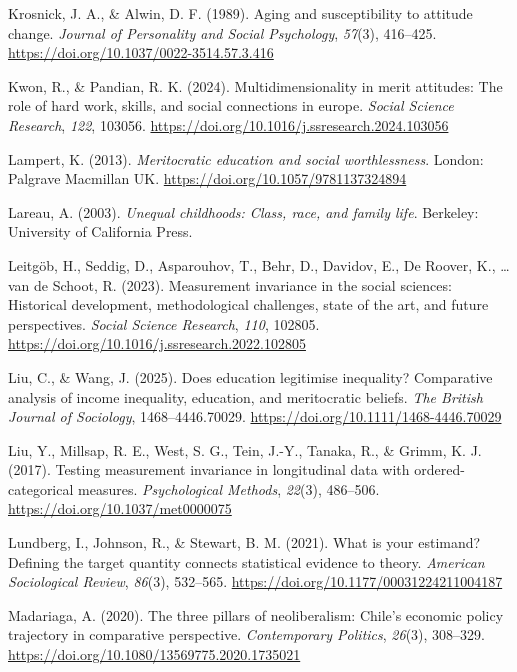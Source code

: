 \documentclass[
  11pt,
]{article}
\newlength{\cslhangindent}
\newenvironment{CSLReferences}[2] %
 {\begin{list}{}{%
  \setlength{\itemindent}{0pt}
  \setlength{\leftmargin}{0pt}
  \setlength{\parsep}{0pt}
  \ifodd #1
   \setlength{\leftmargin}{\cslhangindent}
   \setlength{\itemindent}{-1\cslhangindent}
  \fi
  \setlength{\itemsep}{#2\baselineskip}}}
 {\end{list}}
\begin{document}
\begin{CSLReferences}{1}{0}
Krosnick, J. A., \& Alwin, D. F. (1989). Aging and susceptibility to
attitude change. \emph{Journal of Personality and Social Psychology},
\emph{57}(3), 416--425. \url{https://doi.org/10.1037/0022-3514.57.3.416}

Kwon, R., \& Pandian, R. K. (2024). Multidimensionality in merit
attitudes: The role of hard work, skills, and social connections in
europe. \emph{Social Science Research}, \emph{122}, 103056.
\url{https://doi.org/10.1016/j.ssresearch.2024.103056}

Lampert, K. (2013). \emph{Meritocratic education and social
worthlessness}. London: Palgrave Macmillan UK.
\url{https://doi.org/10.1057/9781137324894}

Lareau, A. (2003). \emph{Unequal childhoods: Class, race, and family
life}. Berkeley: University of California Press.

Leitgöb, H., Seddig, D., Asparouhov, T., Behr, D., Davidov, E., De
Roover, K., \ldots{} van de Schoot, R. (2023). Measurement invariance in
the social sciences: Historical development, methodological challenges,
state of the art, and future perspectives. \emph{Social Science
Research}, \emph{110}, 102805.
\url{https://doi.org/10.1016/j.ssresearch.2022.102805}

Liu, C., \& Wang, J. (2025). Does education legitimise inequality?
Comparative analysis of income inequality, education, and meritocratic
beliefs. \emph{The British Journal of Sociology}, 1468--4446.70029.
\url{https://doi.org/10.1111/1468-4446.70029}

Liu, Y., Millsap, R. E., West, S. G., Tein, J.-Y., Tanaka, R., \& Grimm,
K. J. (2017). Testing measurement invariance in longitudinal data with
ordered-categorical measures. \emph{Psychological Methods},
\emph{22}(3), 486--506. \url{https://doi.org/10.1037/met0000075}

Lundberg, I., Johnson, R., \& Stewart, B. M. (2021). What is your
estimand? Defining the target quantity connects statistical evidence to
theory. \emph{American Sociological Review}, \emph{86}(3), 532--565.
\url{https://doi.org/10.1177/00031224211004187}

Madariaga, A. (2020). The three pillars of neoliberalism: Chile's
economic policy trajectory in comparative perspective.
\emph{Contemporary Politics}, \emph{26}(3), 308--329.
\url{https://doi.org/10.1080/13569775.2020.1735021}


\end{CSLReferences}
\end{document}
